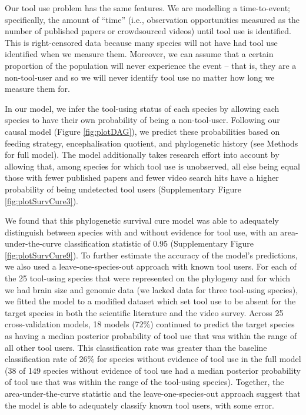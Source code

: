 \documentclass[
  man, donotrepeattitle,floatsintext]{apa6}
\begin{document}
Our tool use problem has the same features. We are modelling a time-to-event;
specifically, the amount of ``time'' (i.e., observation opportunities measured as
the number of published papers or crowdsourced videos) until tool use is
identified. This is right-censored data because many species will not have had
tool use identified when we measure them. Moreover, we can assume that a certain
proportion of the population will never experience the event -- that is, they
are a non-tool-user and so we will never identify tool use no matter how long we
measure them for.

In our model, we infer the tool-using status of each species by allowing each
species to have their own probability of being a non-tool-user. Following our
causal model (Figure \ref{fig:plotDAG}), we predict these probabilities based
on feeding strategy, encephalisation quotient, and phylogenetic history (see
Methods for full model). The model additionally takes research effort into
account by allowing that, among species for which tool use is unobserved, all
else being equal those with fewer published papers and fewer video search hits
have a higher probability of being undetected tool users (Supplementary Figure
\ref{fig:plotSurvCure3}).

We found that this phylogenetic survival cure model was able to adequately
distinguish between species with and without evidence for tool use, with an
area-under-the-curve classification statistic of
0.95 (Supplementary Figure
\ref{fig:plotSurvCure9}). To further estimate the accuracy of the model's
predictions, we also used a leave-one-species-out approach with known tool
users. For each of the 25 tool-using species that were represented on the
phylogeny and for which we had brain size and genomic data (we lacked data for
three tool-using species), we fitted the model to a modified dataset which set
tool use to be absent for the target species in both the scientific literature
and the video survey. Across 25 cross-validation models,
18 models (72\%)
continued to predict the target species as having a median posterior probability
of tool use that was within the range of all other tool users. This
classification rate was greater than the baseline classification rate of
26\%
for species without evidence of tool use in the full model
(38
of 149 species without
evidence of tool use had a median posterior probability of tool use that was
within the range of the tool-using species). Together, the area-under-the-curve
statistic and the leave-one-species-out approach suggest that the model is able
to adequately classify known tool users, with some error.
\end{document}
